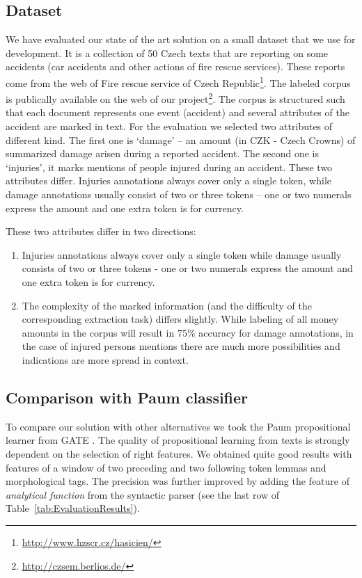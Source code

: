 \subsection{Dataset}
We have evaluated our state of the art solution on a small dataset that we use for development. It is a collection of 50 Czech texts that are reporting on some accidents (car accidents and other actions of fire rescue services). These reports come from the web of Fire rescue service of Czech Republic\footnote{\url{http://www.hzscr.cz/hasicien/}}. The labeled corpus is publically available on the web of our project\footnote{\url{http://czsem.berlios.de/}}.
The corpus is structured such that each document represents one event (accident) and several attributes of the accident are marked in text. For the evaluation we selected two attributes of different kind. The first one is `damage' -- an amount (in CZK - Czech Crowns) of summarized damage arisen during a reported accident. The second one is `injuries', it marks mentions of people injured during an accident. These two attributes differ. Injuries annotations always cover only a single token, while damage annotations usually consist of two or three tokens -- one or two numerals express the amount and one extra token is for currency.

These two attributes differ in two directions:
\begin{enumerate}
	\item Injuries annotations always cover only a single token while damage usually consists of two or three tokens - one or two numerals express the amount and one extra token is for currency.
	\item The complexity of the marked information (and the difficulty of the corresponding extraction task) differs slightly. While labeling of all money amounts in the corpus will result in 75\% accuracy for damage annotations, in the case of injured persons mentions there are much more possibilities and indications are more spread in context.
\end{enumerate}

\subsection{Comparison with Paum classifier}
To compare our solution with other alternatives we took the Paum propositional learner from GATE \citep{Li:Paum}. The quality of propositional learning from texts is strongly dependent on the selection of right features. We obtained quite good results with features of a window of two preceding and two following token lemmas and morphological tags. The precision was further improved by adding the feature of \emph{analytical function} from the syntactic parser (see the last row of Table~\ref{tab:EvaluationResults}).

